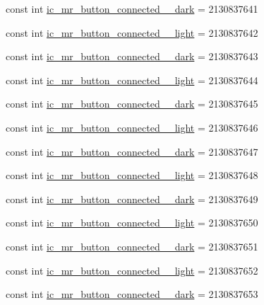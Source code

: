 \begin{CompactItemize}
const int \hyperlink{class__2doo_1_1_droid_1_1_resource_1_1_drawable_5ecd33884ccf22fa334d8d769331525c}{ic\_\-mr\_\-button\_\-connected\_\_\-dark} = 2130837641
\item 
const int \hyperlink{class__2doo_1_1_droid_1_1_resource_1_1_drawable_a63b9f9caf28b63a386c6d2bd6a266d5}{ic\_\-mr\_\-button\_\-connected\_\_\-light} = 2130837642
\item 
const int \hyperlink{class__2doo_1_1_droid_1_1_resource_1_1_drawable_e13fb52fe2ca685ea20df0dfb7bb69a0}{ic\_\-mr\_\-button\_\-connected\_\_\-dark} = 2130837643
\item 
const int \hyperlink{class__2doo_1_1_droid_1_1_resource_1_1_drawable_cfda09a17b0bbc908bcdbe9637bc97e6}{ic\_\-mr\_\-button\_\-connected\_\_\-light} = 2130837644
\item 
const int \hyperlink{class__2doo_1_1_droid_1_1_resource_1_1_drawable_439e94841e068abdbd4d2b926b8086f4}{ic\_\-mr\_\-button\_\-connected\_\_\-dark} = 2130837645
\item 
const int \hyperlink{class__2doo_1_1_droid_1_1_resource_1_1_drawable_177f86097f9aa91eaf6257f3646cf71d}{ic\_\-mr\_\-button\_\-connected\_\_\-light} = 2130837646
\item 
const int \hyperlink{class__2doo_1_1_droid_1_1_resource_1_1_drawable_347a376e20b8ffa91782caa35f29b472}{ic\_\-mr\_\-button\_\-connected\_\_\-dark} = 2130837647
\item 
const int \hyperlink{class__2doo_1_1_droid_1_1_resource_1_1_drawable_d46aa34e403cd04e3219b97ebc262114}{ic\_\-mr\_\-button\_\-connected\_\_\-light} = 2130837648
\item 
const int \hyperlink{class__2doo_1_1_droid_1_1_resource_1_1_drawable_6a636f7d1f4972915a1ae5b8e954a5cb}{ic\_\-mr\_\-button\_\-connected\_\_\-dark} = 2130837649
\item 
const int \hyperlink{class__2doo_1_1_droid_1_1_resource_1_1_drawable_f38a98d35940a97fbc7c39ba7c8e6645}{ic\_\-mr\_\-button\_\-connected\_\_\-light} = 2130837650
\item 
const int \hyperlink{class__2doo_1_1_droid_1_1_resource_1_1_drawable_f443541ac58ee33d8232e76ec3988897}{ic\_\-mr\_\-button\_\-connected\_\_\-dark} = 2130837651
\item 
const int \hyperlink{class__2doo_1_1_droid_1_1_resource_1_1_drawable_359ab179ec69d2e1ca7e0a90063c9d6e}{ic\_\-mr\_\-button\_\-connected\_\_\-light} = 2130837652
\item 
const int \hyperlink{class__2doo_1_1_droid_1_1_resource_1_1_drawable_156c5d5fd9c90cf36c7648d5e42271c3}{ic\_\-mr\_\-button\_\-connected\_\_\-dark} = 2130837653

\end{CompactItemize}
